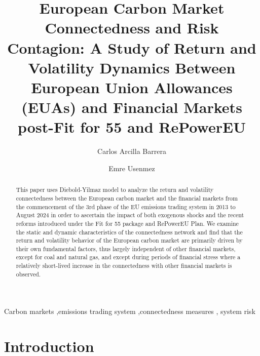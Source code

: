 \documentclass[preprint, 3p,
authoryear]{elsarticle} %
\begin{document}
\begin{frontmatter}

  \title{European Carbon Market Connectedness and Risk Contagion: A
Study of Return and Volatility Dynamics Between European Union
Allowances (EUAs) and Financial Markets post-Fit for 55 and RePowerEU}
    \author[cisl,sigma]{Carlos Arcilla Barrera%
  }
    \author[cam]{Emre Usenmez%
  }
  
  \begin{abstract}
  This paper uses Diebold-Yilmaz model to analyze the return and
  volatility connectedness between the European carbon market and the
  financial markets from the commencement of the 3rd phase of the EU
  emissions trading system in 2013 to August 2024 in order to ascertain
  the impact of both exogenous shocks and the recent reforms introduced
  under the Fit for 55 package and RePowerEU Plan. We examine the static
  and dynamic characteristics of the connectedness network and find that
  the return and volatility behavior of the European carbon market are
  primarily driven by their own fundamental factors, thus largely
  independent of other financial markets, except for coal and natural
  gas, and except during periods of financial stress where a relatively
  short-lived increase in the connectedness with other financial markets
  is observed.
  \end{abstract}
    \begin{keyword}
    Carbon markets \sep emissions trading system \sep connectedness
measures \sep 
    system risk
  \end{keyword}
  
 \end{frontmatter}

\hypertarget{introduction}{%
\section{Introduction}\label{introduction}}
\end{document}
